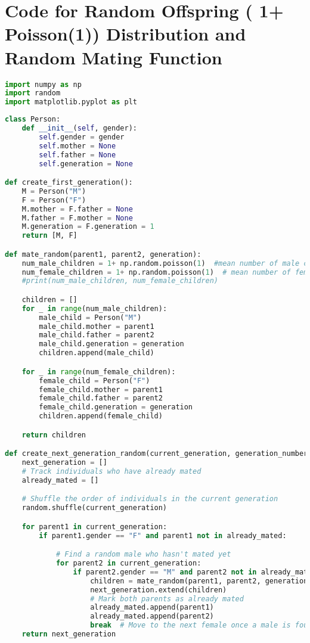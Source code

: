 
\section*{Code for Random Offspring ( 1+ Poisson(1)) Distribution and Random Mating Function}
\begin{lstlisting}[language=Python]
import numpy as np
import random
import matplotlib.pyplot as plt
\end{lstlisting}
\begin{lstlisting}[language=Python]
class Person:
    def __init__(self, gender):
        self.gender = gender
        self.mother = None
        self.father = None
        self.generation = None

def create_first_generation():
    M = Person("M")
    F = Person("F")
    M.mother = F.father = None
    M.father = F.mother = None
    M.generation = F.generation = 1
    return [M, F]

def mate_random(parent1, parent2, generation):
    num_male_children = 1+ np.random.poisson(1)  #mean number of male children is 1
    num_female_children = 1+ np.random.poisson(1)  # mean number of female children is 1
    #print(num_male_children, num_female_children)

    children = []
    for _ in range(num_male_children):
        male_child = Person("M")
        male_child.mother = parent1
        male_child.father = parent2
        male_child.generation = generation
        children.append(male_child)

    for _ in range(num_female_children):
        female_child = Person("F")
        female_child.mother = parent1
        female_child.father = parent2
        female_child.generation = generation
        children.append(female_child)

    return children

def create_next_generation_random(current_generation, generation_number):
    next_generation = []
    # Track individuals who have already mated
    already_mated = []

    # Shuffle the order of individuals in the current generation
    random.shuffle(current_generation)

    for parent1 in current_generation:
        if parent1.gender == "F" and parent1 not in already_mated:

            # Find a random male who hasn't mated yet
            for parent2 in current_generation:
                if parent2.gender == "M" and parent2 not in already_mated:
                    children = mate_random(parent1, parent2, generation_number)
                    next_generation.extend(children)
                    # Mark both parents as already mated
                    already_mated.append(parent1)
                    already_mated.append(parent2)
                    break  # Move to the next female once a male is found
    return next_generation
\end{lstlisting}
